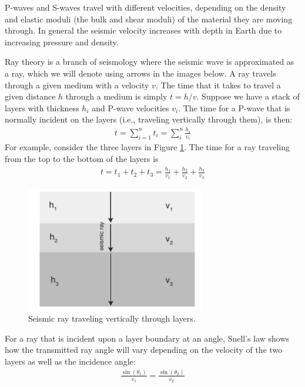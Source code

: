 \documentclass[11pt, oneside]{article}   	%
\begin{document}
P-waves and S-waves travel with different velocities, depending on the density and elastic moduli (the bulk and shear moduli) of the material they are moving through. In general the seismic velocity increases with depth in Earth due to increasing pressure and density.  

Ray theory is a branch of seismology where the seismic wave is approximated as a ray, which we will denote using arrows in the images below. A ray travels through a given medium with a velocity $v$.  The time that it takes to travel a given distance $h$ through a medium is simply $ t = h/v$.  Suppose we have a stack of layers with thickness $h_i$ and P-wave velocities $v_i$. The time for a P-wave that is normally incident on the layers (i.e., traveling vertically through them), is then:
\begin{eqnarray}
 t = \sum_{i=1}^n t_i = \sum_i^n \frac{h_i}{v_i} 
\end{eqnarray}
For example, consider the three layers in Figure \ref{layers}.  The time for  a ray traveling from the top to the bottom of the layers is 
\begin{eqnarray}
 t = t_1 + t_2 + t_3 = \frac{h_1}{v_1} +  \frac{h_2}{v_2} +  \frac{h_3}{v_3} 
\end{eqnarray}


\begin{figure}[htbp]
\begin{center}
\includegraphics[width=0.7\textwidth]{seismic_layers.pdf}
\caption{Seismic ray traveling vertically through layers. }
\label{layers}
\end{center}
\end{figure}

For a ray that is incident upon a layer boundary at an angle, Snell's law shows how the transmitted ray angle will vary depending on the velocity of the two layers as well as the incidence angle:
\begin{eqnarray}
\frac{\sin(\theta_1)}{v_1} = \frac{\sin(\theta_2)}{v_2}
\end{eqnarray}
\end{document}
